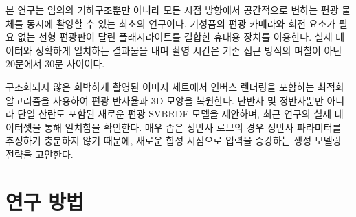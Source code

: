 \documentclass[a4paper,twocolumn]{article}
\begin{document}
본 연구는 임의의 기하구조뿐만 아니라 모든 시점 방향에서 공간적으로 변하는 편광 물체를 동시에 촬영할 수 있는 최초의 연구이다. 기성품의 편광 카메라와 회전 요소가 필요 없는 선형 편광판이 달린 플래시라이트를 결합한 휴대용 장치를 이용한다. 
실제 데이터와 정확하게 일치하는 결과물을 내며 촬영 시간은 기존 접근 방식의 며칠이 아닌 20분에서 30분 사이이다.

구조화되지 않은 희박하게 촬영된 이미지 세트에서 인버스 렌더링을 포함하는 최적화 알고리즘을 사용하여 편광 반사율과 3D 모양을 복원한다. 
난반사 및 정반사뿐만 아니라 단일 산란도 포함된 새로운 편광 SVBRDF 모델을 제안하며, 최근 연구의 실제 데이터셋을 통해 일치함을 확인한다.
매우 좁은 정반사 로브의 경우 정반사 파라미터를 추정하기 충분하지 않기 때문에, 새로운 합성 시점으로 입력을 증강하는 생성 모델링 전략을 고안한다.

\section{연구 방법}
\label{sec:methods}
\end{document}
